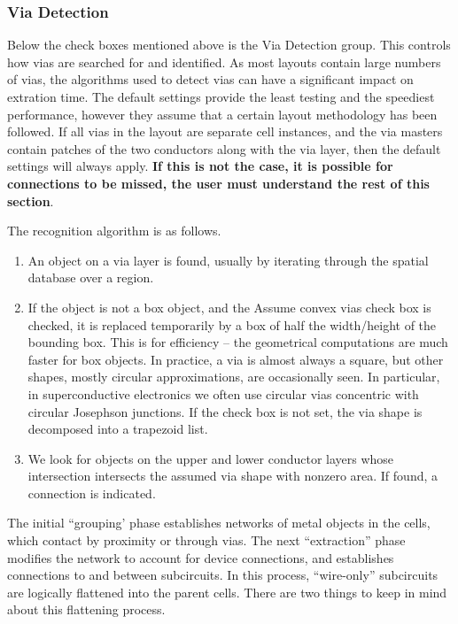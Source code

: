 \subsubsection{Via Detection}
\label{viafind}

Below the check boxes mentioned above is the {\cb Via Detection}
group.  This controls how vias are searched for and identified.  As
most layouts contain large numbers of vias, the algorithms used to
detect vias can have a significant impact on extration time.  The
default settings provide the least testing and the speediest
performance, however they assume that a certain layout methodology has
been followed.  If all vias in the layout are separate cell instances,
and the via masters contain patches of the two conductors along with
the via layer, then the default settings will always apply.  {\bf If
this is not the case, it is possible for connections to be missed, the
user must understand the rest of this section}.

The recognition algorithm is as follows.

\begin{enumerate}
\item{An object on a via layer is found, usually by iterating through
the spatial database over a region.}

\item{If the object is not a box object, and the {\cb Assume convex
vias} check box is checked, it is replaced temporarily by a box of
half the width/height of the bounding box.  This is for efficiency --
the geometrical computations are much faster for box objects.  In
practice, a via is almost always a square, but other shapes, mostly
circular approximations, are occasionally seen.  In particular, in
superconductive electronics we often use circular vias concentric with
circular Josephson junctions.  If the check box is not set, the via
shape is decomposed into a trapezoid list.}

\item{We look for objects on the upper and lower conductor layers
whose intersection intersects the assumed via shape with nonzero area. 
If found, a connection is indicated.}
\end{enumerate}

The initial ``grouping' phase establishes networks of metal objects in
the cells, which contact by proximity or through vias.  The next
``extraction'' phase modifies the network to account for device
connections, and establishes connections to and between subcircuits. 
In this process, ``wire-only'' subcircuits are logically flattened
into the parent cells.  There are two things to keep in mind about
this flattening process.

